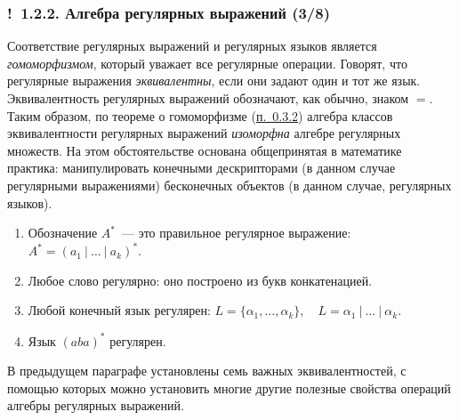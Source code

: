 \documentclass[mathserif,12pt,aspectratio=169]{beamer}
\def\emразделенной{\em разделенной}
\renewcommand{\index}[1]{}
\def\em#1{\it\color{blue}#1}
\def\odmkey#1#2{{\it\color{red} #1}\index{#2}}
\def\DMref#1#2{{\color{blue}\underline{\hyperlink{#2}{#1}}}}
\def\Ok{{\color{green}\textbf{!}\ }}
\begin{document}
\begin{frame}
\frametitle{\Ok 1.2.2. Алгебра регулярных выражений (3/8)}
Соответствие регулярных выражений и регулярных языков является 
{\em гомоморфизмом}, который уважает все регулярные операции.
Говорят, что регулярные выражения
\odmkey{эквивалентны}{Эквивалентность!регулярных выражений}, если они задают
один и тот же язык. 
Эквивалентность регулярных 
выражений обозначают, как обычно, знаком $=$.
Таким образом, по теореме о гомоморфизме
(\DMref{п.~0.3.2}{0.3.2.}) алгебра классов эквивалентности
регулярных выражений {\em изоморфна} алгебре регулярных множеств.
На этом обстоятельстве основана общепринятая в математике практика:
манипулировать конечными дескрипторами (в данном случае регулярными выражениями)
бесконечных объектов (в данном случае, регулярных языков).

\begin{examples}
\begin{enumerate}
  \item Обозначение $A^*$~--- это правильное регулярное выражение:
  $
A^*=(a_1~|~\dots~|~ a_k)^*.
$
  \item Любое слово регулярно: оно построено из букв
  конкатенацией.
  \item Любой конечный язык регулярен:
$
L=\{\alpha_1,\dots, \alpha_k\},\quad
  L=\alpha_1~|~\dots~|~\alpha_k.
$
  \item  Язык $(aba)^*$  регулярен.
\end{enumerate}
\end{examples}

В предыдущем параграфе
установлены семь важных эквивалентностей,
с помощью которых можно установить многие другие
полезные свойства операций алгебры регулярных
выражений.  

\end{frame}
\end{document}
